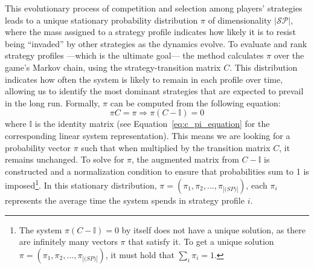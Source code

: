         \noindent
        This evolutionary process of competition and selection among players' strategies leads to a unique stationary probability distribution $\pi$ of dimensionality $|\mathcal{SP}|$, where the mass assigned to a strategy profile indicates how likely it is to resist being ``invaded'' by other strategies as the dynamics evolve. To evaluate and rank strategy profiles —which is the ultimate goal— the method calculates $\pi$ over the game's Markov chain, using the strategy-transition matrix $C$. This distribution indicates how often the system is likely to remain in each profile over time, allowing us to identify the most dominant strategies that are expected to prevail in the long run. Formally, $\pi$ can be computed from the following equation:
        \begin{equation}
            \pi C = \pi \Rightarrow \pi (C - \mathbb{I}) = 0 
            \label{eq:stationary_distribution}
        \end{equation}
        where $\mathbb{I}$ is the identity matrix (see Equation~\ref{eq:c_pi_equation} for the corresponding linear system representation). This means we are looking for a probability vector $\pi$ such that when multiplied by the transition matrix $C$, it remains unchanged. To solve for $\pi$, the augmented matrix from $C - \mathbb{I}$ is constructed and a normalization condition to ensure that probabilities sum to 1 is imposed\footnote{The system $\pi(C - \mathbb{I}) = 0$ by itself does not have a unique solution, as there are infinitely many vectors $\pi$ that satisfy it. To get a unique solution $\pi=(\pi_1,\pi_2,..., \pi_{|\mathcal(SP)|})$, it must hold that $\sum_{i} \pi_i = 1$.}. In this stationary distribution, $\pi=(\pi_1,\pi_2,..., \pi_{|\mathcal(SP)|})$, each $\pi_i$ represents the average time the system spends in strategy profile $i$.
